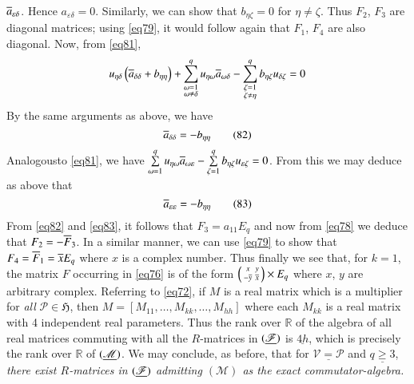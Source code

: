 $\overline{a}_{\varepsilon\delta}$. Hence $a_{\varepsilon\delta}=0$. Similarly, we
can show that $b_{\eta\zeta}=0$ for $\eta\neq\zeta$. Thus $F_{2}$,
$F_{3}$ are diagonal matrices; using \eqref{eq79}, it would follow again
that $F_{1}$, $F_{4}$ are also diagonal. Now, from \eqref{eq81},
$$
u_{\eta\delta}\left(\overline{a}_{\delta\delta}+b_{\eta\eta}\right)+
\sum^{q}_{\substack{\omega=1\\\omega\neq
\delta}}u_{\eta\omega}\overline{a}_{\omega\delta}-
\sum^{q}_{\substack{\zeta=1\\\zeta\neq
\eta}}b_{\eta\zeta}u_{\delta\zeta}=0 
$$
By the same arguments as above, we have
\begin{equation*}
\overline{a}_{\delta\delta}=-b_{\eta\eta}\tag{82}\label{eq82}
\end{equation*}
Analogous\pageoriginale to \eqref{eq81}, we have
$\sum\limits^{q}_{\omega=1}u_{\eta\omega}\overline{a}_{\omega\varepsilon}-
\sum\limits^{q}_{\zeta=1}b_{\eta\zeta}u_{\varepsilon\zeta}=0$. From  
this we may deduce as above that
\begin{equation*}
\overline{a}_{\varepsilon\varepsilon}=-b_{\eta\eta}\tag{83}\label{eq83}
\end{equation*}
From \eqref{eq82} and \eqref{eq83}, it follows that $F_{3}=a_{11}E_{q}$
and now from \eqref{eq78} we deduce that $F_{2}=-\overline{F}_{3}$. In a
similar manner, we can use \eqref{eq79} to show that
$F_{4}=\overline{F}_{1}=\overline{x}E_{q}$ where $x$ is a complex number. Thus
finally we see that, for $k=1$, the matrix $F$ occurring in \eqref{eq76}
is of the form $\left(\begin{smallmatrix} x & y\\ -\overline{y} & \overline{x}
\end{smallmatrix}\right)\times E_{q}$ where $x$, $y$ are arbitrary
complex. Referring to \eqref{eq72}, if $M$ is a real matrix which is a
multiplier for {\em all} $\mathscr{P}\in\mathfrak{H}$, then
$M=[M_{11},\ldots,M_{kk},\ldots,M_{hh}]$ where each $M_{kk}$ is a real
matrix with 4 independent real parameters. Thus the rank over
$\mathbb{R}$ of the algebra of all real matrices commuting with all
the $R$-matrices in $(\underline{\mathscr{F}})$ is $\underline{4h}$, which is
precisely the rank over $\mathbb{R}$ of $(\underline{\mathscr{M}})$. We may
conclude, as before, that for $\underline{\mathscr{V}=\mathscr{P}}$
and $\underline{q\geq 3}$, {\em there exist $R$-matrices in
  $(\underline{\mathscr{F}})$ admitting $(\mathscr{M})$ as the exact
  commutator-algebra.} 

